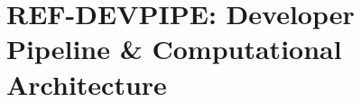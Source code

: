 %
%
%
%

\chapter{REF-DEVPIPE: Developer Pipeline \& Computational Architecture}
\label{app:ref-devpipe}

\begin{abstract}
This appendix provides a comprehensive guide for developers implementing the
Evidence-Based Framework (EBF). It answers the fundamental questions: What is
a ``result'' in EBF? How do the components connect computationally? What is
the data flow from input to output? The appendix documents the complete
computational pipeline, database architecture, script inventory, and provides
concrete implementation workflows. While Appendix FM shows where proofs are,
this appendix shows how to \textit{compute} results.
\end{abstract}

